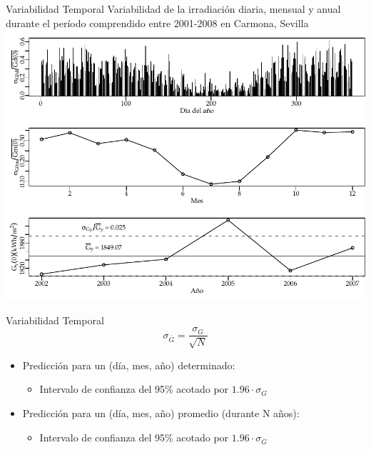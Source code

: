 \documentclass[xcolor={usenames,svgnames,dvipsnames}]{beamer}
\begin{document}
\begin{frame}[label=sec-6-1-2]{Variabilidad Temporal}
Variabilidad de la irradiación diaria, mensual y anual durante el período comprendido entre 2001-2008 en Carmona, Sevilla
\includegraphics[width=.9\linewidth]{../figs/VariabilidadRadiacionDiario.pdf}

\nocite{Perpinan2009}
\end{frame}

\begin{frame}[label=sec-6-1-3]{Variabilidad Temporal}
\[
\sigma_{\overline{G}}=\frac{\sigma_{G}}{\sqrt{N}}
\]

\begin{itemize}
\item Predicción para un (día, mes, año) \alert{determinado}: 

\begin{itemize}
\item Intervalo de confianza del 95\% acotado por $1.96\cdot\sigma_{G}$
\end{itemize}

\item Predicción para un (día, mes, año) \alert{promedio (durante N años)}: 

\begin{itemize}
\item Intervalo de confianza del 95\% acotado por $1.96\cdot\sigma_{\overline{G}}$
\end{itemize}
\end{itemize}
\end{frame}
\end{document}
